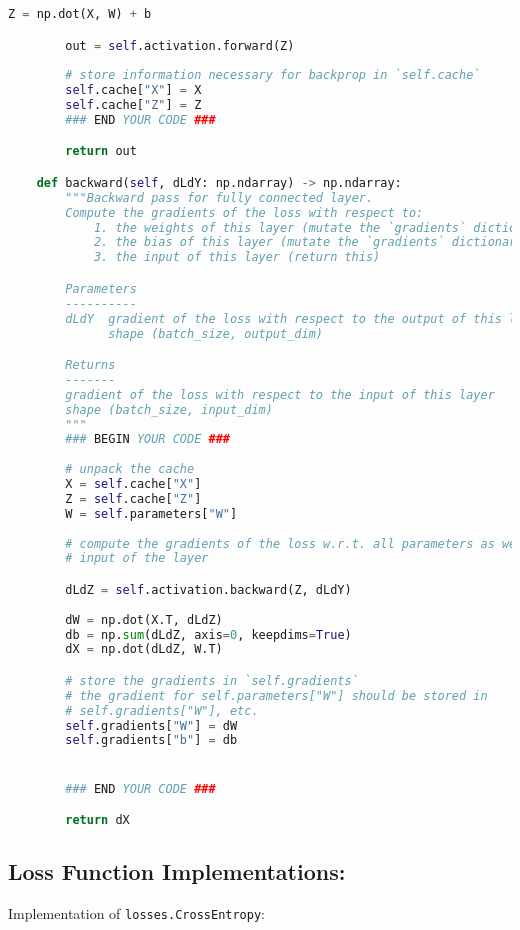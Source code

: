 \begin{lstlisting}[language=Python]
        Z = np.dot(X, W) + b

        out = self.activation.forward(Z)
        
        # store information necessary for backprop in `self.cache`
        self.cache["X"] = X
        self.cache["Z"] = Z
        ### END YOUR CODE ###

        return out

    def backward(self, dLdY: np.ndarray) -> np.ndarray:
        """Backward pass for fully connected layer.
        Compute the gradients of the loss with respect to:
            1. the weights of this layer (mutate the `gradients` dictionary)
            2. the bias of this layer (mutate the `gradients` dictionary)
            3. the input of this layer (return this)

        Parameters
        ----------
        dLdY  gradient of the loss with respect to the output of this layer
              shape (batch_size, output_dim)

        Returns
        -------
        gradient of the loss with respect to the input of this layer
        shape (batch_size, input_dim)
        """
        ### BEGIN YOUR CODE ###
        
        # unpack the cache
        X = self.cache["X"]
        Z = self.cache["Z"]
        W = self.parameters["W"]
        
        # compute the gradients of the loss w.r.t. all parameters as well as the
        # input of the layer

        dLdZ = self.activation.backward(Z, dLdY)
        
        dW = np.dot(X.T, dLdZ)
        db = np.sum(dLdZ, axis=0, keepdims=True)
        dX = np.dot(dLdZ, W.T)

        # store the gradients in `self.gradients`
        # the gradient for self.parameters["W"] should be stored in
        # self.gradients["W"], etc.
        self.gradients["W"] = dW
        self.gradients["b"] = db


        ### END YOUR CODE ###

        return dX

\end{lstlisting}


\subsection{Loss Function Implementations:}

Implementation of \texttt{losses.CrossEntropy}:

